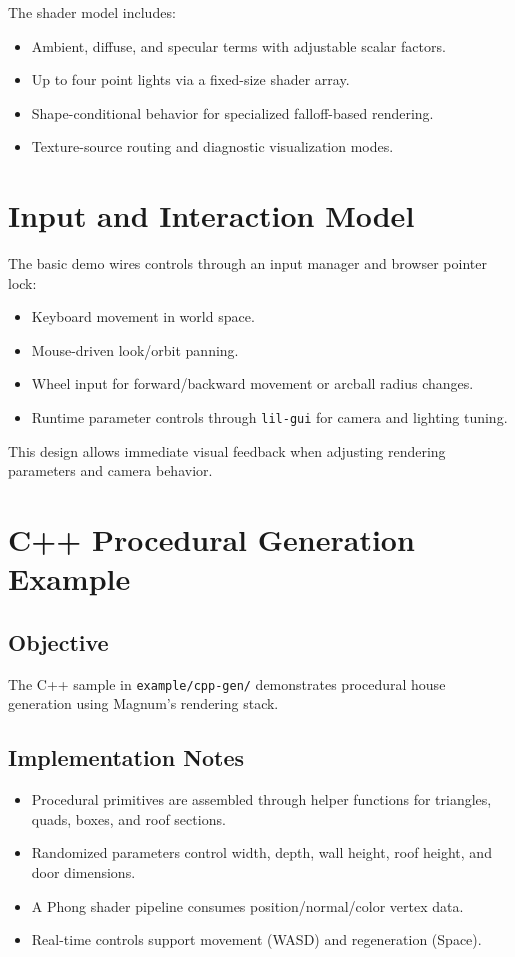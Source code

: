 \documentclass[11pt]{article}
\begin{document}
The shader model includes:
\begin{itemize}[leftmargin=*]
  \item Ambient, diffuse, and specular terms with adjustable scalar factors.
  \item Up to four point lights via a fixed-size shader array.
  \item Shape-conditional behavior for specialized falloff-based rendering.
  \item Texture-source routing and diagnostic visualization modes.
\end{itemize}

\section{Input and Interaction Model}

The basic demo wires controls through an input manager and browser pointer lock:
\begin{itemize}[leftmargin=*]
  \item Keyboard movement in world space.
  \item Mouse-driven look/orbit panning.
  \item Wheel input for forward/backward movement or arcball radius changes.
  \item Runtime parameter controls through \texttt{lil-gui} for camera and lighting tuning.
\end{itemize}

This design allows immediate visual feedback when adjusting rendering parameters and camera behavior.

\section{C++ Procedural Generation Example}

\subsection{Objective}

The C++ sample in \texttt{example/cpp-gen/} demonstrates procedural house generation using Magnum's rendering stack.

\subsection{Implementation Notes}

\begin{itemize}[leftmargin=*]
  \item Procedural primitives are assembled through helper functions for triangles, quads, boxes, and roof sections.
  \item Randomized parameters control width, depth, wall height, roof height, and door dimensions.
  \item A Phong shader pipeline consumes position/normal/color vertex data.
  \item Real-time controls support movement (WASD) and regeneration (Space).
\end{itemize}
\end{document}
